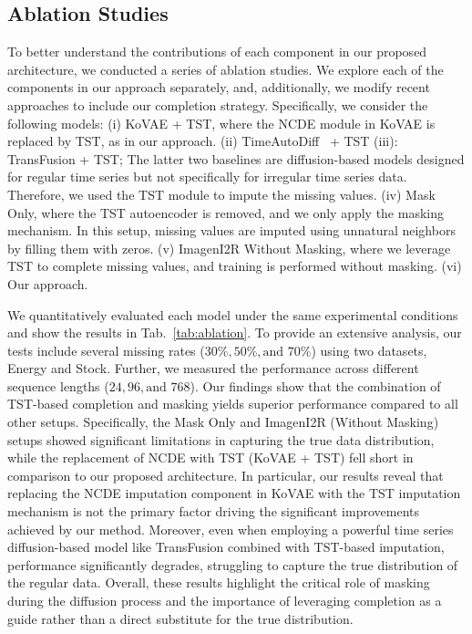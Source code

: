 \documentclass{article}
\theoremstyle{plain}
\theoremstyle{definition}
\theoremstyle{remark}
\begin{document}
\vspace{-2mm}
\subsection{Ablation Studies}
\label{subsec:ablation}
\vspace{-2mm}

To better understand the contributions of each component in our proposed architecture, we conducted a series of ablation studies. We explore each of the components in our approach separately, and, additionally, we modify recent approaches to include our completion strategy. Specifically, we consider the following models: (i) KoVAE + TST, where the NCDE module in KoVAE is replaced by TST, as in our approach. (ii) TimeAutoDiff~\cite{suh2024timeautodiff} + TST (iii): TransFusion \cite{sikder2023transfusion}
 + TST; The latter two baselines are diffusion-based models designed for regular time series but not specifically for irregular time series data. Therefore, we used the TST module to impute the missing values. (iv) Mask Only, where the TST autoencoder is removed, and we only apply the masking mechanism. In this setup, missing values are imputed using unnatural neighbors by filling them with zeros. (v) ImagenI2R Without Masking, where we leverage TST to complete missing values, and training is performed without masking. (vi) Our approach.



We quantitatively evaluated each model under the same experimental conditions and show the results in Tab.~\ref{tab:ablation}. To provide an extensive analysis, our tests include several missing rates ($30\%, 50\%, \text{and } 70\%$) using two datasets, Energy and Stock. Further, we measured the performance across different sequence lengths ($24, 96, \text{and } 768$). Our findings show that the combination of TST-based completion and masking yields superior performance compared to all other setups. Specifically, the Mask Only and ImagenI2R (Without Masking) setups showed significant limitations in capturing the true data distribution, while the replacement of NCDE with TST (KoVAE + TST) fell short in comparison to our proposed architecture. In particular, our results reveal that replacing the NCDE imputation component in KoVAE with the TST imputation mechanism is not the primary factor driving the significant improvements achieved by our method. Moreover, even when employing a powerful time series diffusion-based model like TransFusion combined with TST-based
imputation, performance significantly degrades, struggling to capture the true distribution of the regular data. Overall, these results highlight the critical role of masking during the diffusion process and the importance of leveraging completion as a guide rather than a direct substitute for the true distribution. 
\end{document}

